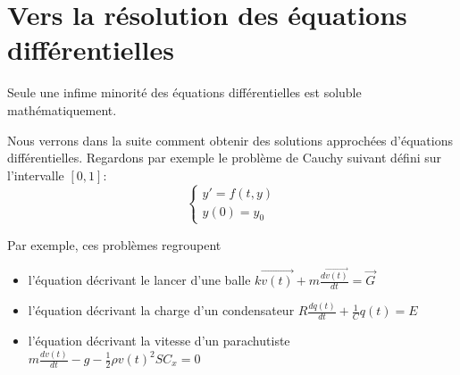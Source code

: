 \documentclass[10pt]{article}
\begin{document}
\vspace{1cm}

\section*{Vers la résolution des équations différentielles}
Seule une infime minorité des équations différentielles est soluble mathématiquement.

Nous verrons dans la suite comment obtenir des solutions approchées d'équations différentielles.
Regardons par exemple le problème de Cauchy suivant défini sur l'intervalle $[0,1]$: 
\[
\begin{cases}
    y' = f(t,y) \\
    y(0) = y_0
\end{cases}
\]

Par exemple, ces problèmes regroupent 
\begin{itemize}
    \item l'équation décrivant le lancer d'une balle 
    $k \overrightarrow{v(t)}+m \frac{d \overrightarrow{v(t)}}{d t}=\vec{G}$
    \item l'équation décrivant la charge d'un condensateur 
    $R \frac{d q(t)}{d t}+\frac{1}{C} q(t)=E$
    \item l'équation décrivant la vitesse d'un parachutiste 
    $m \frac{d v(t)}{d t}-g-\frac{1}{2} \rho v(t)^2 S C_x=0$
\end{itemize}
\end{document}
